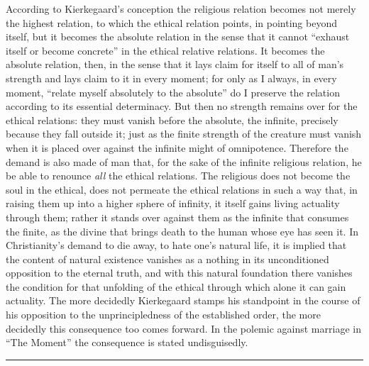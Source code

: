 \documentclass[12pt,a4paper,openany]{book}
\newcommand{\opage}[1]{\marginnote{\footnotesize\textit{[#1]}}}
\begin{document}
According to Kierkegaard's conception the religious relation becomes
not merely the highest relation, to which the ethical relation
points, in pointing beyond itself, but it becomes the
absolute relation in the sense that it cannot ``exhaust
itself or become concrete'' in the ethical relative relations. It
becomes the absolute relation, then, in the sense that it lays claim
for itself to all of man's strength and lays claim to it
in every moment; for only as I always, in every moment, ``relate
myself absolutely to the absolute'' do I preserve the relation
according to its essential determinacy. But then no strength remains
over for the ethical relations: they must vanish before the absolute,
the infinite, precisely because they fall outside it; just as
the finite strength of the creature must vanish when it is placed
over against the infinite might of omnipotence. Therefore the demand is
also made of man that, for the sake of the
infinite religious relation, he be able to renounce \emph{all} the ethical
relations. The religious does not become the soul in the ethical,
does not permeate the ethical relations in such a way that, in
raising them up into a higher sphere of infinity, it itself gains
living actuality through them; rather it stands over against them as
the infinite that consumes the finite, as the divine
that brings death to the human whose eye has seen it.
In Christianity's demand to die away, to hate one's natural
life, it is implied that the content of natural existence
vanishes as a nothing in its unconditioned opposition
to the eternal truth, and with this natural foundation there vanishes
the condition for that unfolding of the ethical through
which alone it can gain actuality. The more decidedly Kierkegaard
stamps his standpoint in the course of his opposition to the
\opage{438}unprincipledness of the established order, the more decidedly this
consequence too comes forward. In the polemic against marriage in ``The Moment''
the consequence is stated undisguisedly.

\begin{center}\rule{1.8cm}{0.4pt}\end{center}
\end{document}
